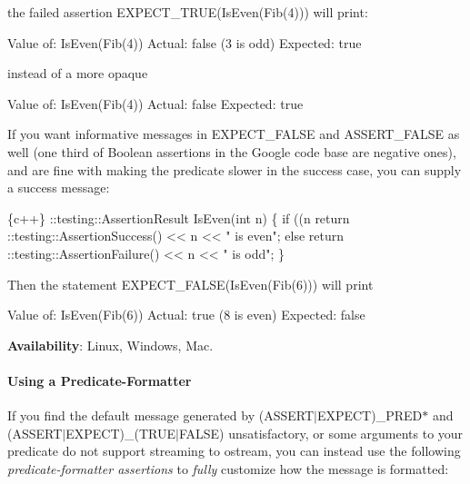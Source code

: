the failed assertion {\ttfamily E\+X\+P\+E\+C\+T\+\_\+\+T\+R\+UE(Is\+Even(\+Fib(4)))} will print\+:


\begin{DoxyCode}
Value of: IsEven(Fib(4))
  Actual: false (3 is odd)
Expected: true
\end{DoxyCode}


instead of a more opaque


\begin{DoxyCode}
Value of: IsEven(Fib(4))
  Actual: false
Expected: true
\end{DoxyCode}


If you want informative messages in {\ttfamily E\+X\+P\+E\+C\+T\+\_\+\+F\+A\+L\+SE} and {\ttfamily A\+S\+S\+E\+R\+T\+\_\+\+F\+A\+L\+SE} as well (one third of Boolean assertions in the Google code base are negative ones), and are fine with making the predicate slower in the success case, you can supply a success message\+:


\begin{DoxyCode}
\{c++\}
::testing::AssertionResult IsEven(int n) \{
  if ((n %
     return ::testing::AssertionSuccess() << n << " is even";
  else
     return ::testing::AssertionFailure() << n << " is odd";
\}
\end{DoxyCode}


Then the statement {\ttfamily E\+X\+P\+E\+C\+T\+\_\+\+F\+A\+L\+SE(Is\+Even(\+Fib(6)))} will print


\begin{DoxyCode}
Value of: IsEven(Fib(6))
   Actual: true (8 is even)
Expected: false
\end{DoxyCode}


{\bfseries Availability}\+: Linux, Windows, Mac.

\paragraph*{Using a Predicate-\/\+Formatter}

If you find the default message generated by {\ttfamily (A\+S\+S\+E\+R\+T$\vert$\+E\+X\+P\+E\+CT)\+\_\+\+P\+R\+E\+D$\ast$} and {\ttfamily (A\+S\+S\+E\+R\+T$\vert$\+E\+X\+P\+E\+CT)\+\_\+(T\+R\+U\+E$\vert$\+F\+A\+L\+SE)} unsatisfactory, or some arguments to your predicate do not support streaming to {\ttfamily ostream}, you can instead use the following {\itshape predicate-\/formatter assertions} to {\itshape fully} customize how the message is formatted\+:

